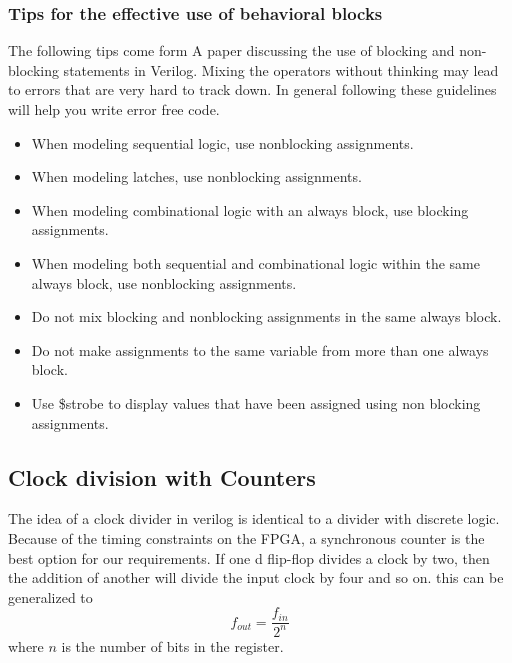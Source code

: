     \subsubsection{Tips for the effective use of behavioral blocks}
      The following tips come form A paper discussing the use of blocking and non-blocking statements in Verilog\cite{Sunburst:BlockNoBlock}. Mixing the operators without thinking may lead to errors that are very hard to track down. In general following these guidelines will help you write error free code.
      \begin{itemize}
        \item When modeling sequential logic, use nonblocking assignments.
        \item When modeling latches, use nonblocking assignments.
        \item When modeling combinational logic with an always block, use blocking assignments.
        \item When modeling both sequential and combinational logic within the same always block, use nonblocking assignments.
        \item Do not mix blocking and nonblocking assignments in the same always block.
        \item Do not make assignments to the same variable from more than one always block.
        \item Use \$strobe to display values that have been assigned using non blocking assignments.
      \end{itemize}

  \subsection{Clock division with Counters}
    The idea of a clock divider in verilog is identical to a divider with discrete logic. Because of the timing constraints on the FPGA, a synchronous counter is the best option for our requirements. If one d flip-flop divides a clock by two, then the addition of another will divide the input clock by four and so on. this can be generalized to $$f_{out}=\frac{f_{in}}{2^n}$$ where $n$ is the number of bits in the register. 
    
